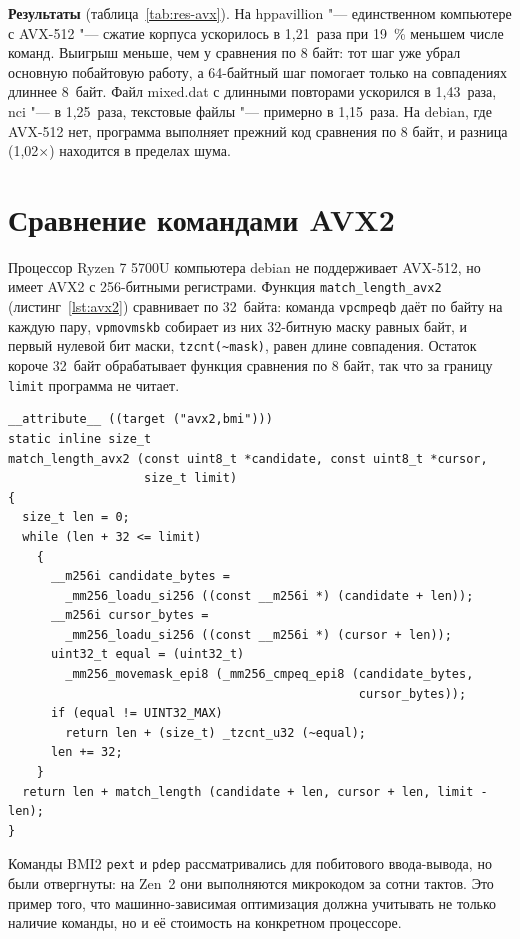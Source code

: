 \textbf{Результаты} (таблица~\ref{tab:res-avx}). На hppavillion "---
единственном компьютере с AVX-512 "--- сжатие корпуса ускорилось в
1,21~раза при 19~\% меньшем числе команд. Выигрыш меньше, чем у сравнения
по 8 байт: тот шаг уже убрал основную побайтовую работу, а 64-байтный шаг
помогает только на совпадениях длиннее 8~байт. Файл mixed.dat с длинными
повторами ускорился в 1,43~раза, nci "--- в 1,25~раза, текстовые файлы "---
примерно в 1,15~раза. На debian, где AVX-512 нет, программа выполняет
прежний код сравнения по 8 байт, и разница (1,02$\times$) находится в
пределах шума.

\section{Сравнение командами AVX2}
\label{sec:avx2}

Процессор Ryzen 7 5700U компьютера debian не поддерживает AVX-512, но
имеет AVX2 с 256-битными регистрами. Функция \texttt{match\_length\_avx2}
(листинг~\ref{lst:avx2}) сравнивает по 32~байта: команда
\texttt{vpcmpeqb} даёт по байту на каждую пару, \texttt{vpmovmskb} собирает
из них 32-битную маску равных байт, и первый нулевой бит маски,
\texttt{tzcnt(\textasciitilde mask)}, равен длине совпадения. Остаток короче
32~байт обрабатывает функция сравнения по 8 байт, так что за границу
\texttt{limit} программа не читает.

\begin{lstlisting}[caption={Сравнение командами AVX2},label={lst:avx2}]
__attribute__ ((target ("avx2,bmi")))
static inline size_t
match_length_avx2 (const uint8_t *candidate, const uint8_t *cursor,
                   size_t limit)
{
  size_t len = 0;
  while (len + 32 <= limit)
    {
      __m256i candidate_bytes =
        _mm256_loadu_si256 ((const __m256i *) (candidate + len));
      __m256i cursor_bytes =
        _mm256_loadu_si256 ((const __m256i *) (cursor + len));
      uint32_t equal = (uint32_t)
        _mm256_movemask_epi8 (_mm256_cmpeq_epi8 (candidate_bytes,
                                                 cursor_bytes));
      if (equal != UINT32_MAX)
        return len + (size_t) _tzcnt_u32 (~equal);
      len += 32;
    }
  return len + match_length (candidate + len, cursor + len, limit - len);
}
\end{lstlisting}

Команды BMI2 \texttt{pext} и \texttt{pdep} рассматривались для побитового
ввода-вывода, но были отвергнуты: на Zen~2 они выполняются микрокодом за
сотни тактов. Это пример того, что машинно-зависимая
оптимизация должна учитывать не только наличие команды, но и её стоимость на
конкретном процессоре.

